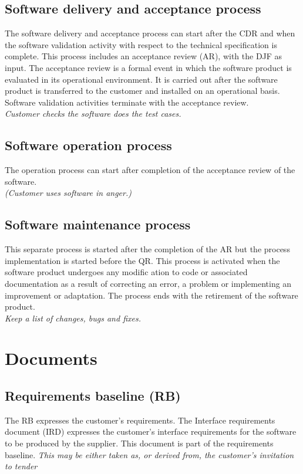 \documentclass[12pt]{article}
\begin{document}
\subsection{Software delivery and acceptance process}
The software delivery and
acceptance process can start after the CDR and when the software validation
activity with respect to the technical specification is complete.
This process includes an acceptance review (AR), with the DJF as input.
The acceptance review is a formal event in which the software product is
evaluated in its operational environment.
It is carried out after the software product is transferred to the customer
and installed on an operational basis.
Software validation activities terminate with the acceptance review. \\
\emph{Customer checks the software does the test cases.}

\subsection{Software operation process}
The operation process can start after
completion of the acceptance review of the software. \\
\emph{(Customer uses software in anger.)}


\subsection{Software maintenance process}
This separate process is started after the
completion of the AR but the process implementation is started before the QR.
This process is activated when the software product undergoes any modific
ation to code or associated documentation as a result of correcting an error,
a problem or implementing an improvement or adaptation.
The process ends with the retirement of the software product. \\
\emph{Keep a list of changes, bugs and fixes.}

\section{Documents}\label{sec:docs}

\subsection{Requirements baseline (RB)}
The RB expresses the customer's requirements.
The Interface requirements document (IRD) expresses the customer's interface requirements for the software
to be produced by the supplier.
This document is part of the requirements baseline.
\emph{This may be either taken as, or derived from, the customer's invitation to tender}
\end{document}
